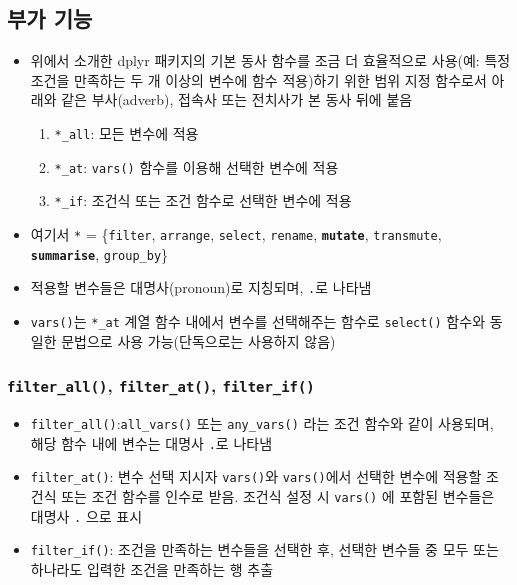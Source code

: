 \documentclass[
  11pt,
]{krantz}
\makeatletter
\providecommand{\tightlist}{%
  \setlength{\itemsep}{0pt}\setlength{\parskip}{0pt}}
\newenvironment{kframe}{%
\medskip{}
\setlength{\fboxsep}{.8em}
 \def\at@end@of@kframe{}%
 \ifinner\ifhmode%
  \def\at@end@of@kframe{\end{minipage}}%
  \begin{minipage}{\columnwidth}%
 \fi\fi%
 \def\FrameCommand##1{\hskip\@totalleftmargin \hskip-\fboxsep
 \colorbox{shadecolor}{##1}\hskip-\fboxsep
     \hskip-\linewidth \hskip-\@totalleftmargin \hskip\columnwidth}%
 \MakeFramed {\advance\hsize-\width
   \@totalleftmargin\z@ \linewidth\hsize
   \@setminipage}}%
 {\par\unskip\endMakeFramed%
 \at@end@of@kframe}
\renewenvironment{quote}{\begin{kframe}}{\end{kframe}}
\makeatother
\begin{document}
\normalsize

\hypertarget{dplyr-verb-variant-adverb}{%
\subsection{부가 기능}\label{dplyr-verb-variant-adverb}}

\begin{itemize}
\item
  위에서 소개한 dplyr 패키지의 기본 동사 함수를 조금 더 효율적으로 사용(예: 특정 조건을 만족하는 두 개 이상의 변수에 함수 적용)하기 위한 범위 지정 함수로서 아래와 같은 부사(adverb), 접속사 또는 전치사가 본 동사 뒤에 붙음

  \begin{enumerate}
  \def\labelenumi{\alph{enumi}.}
  \tightlist
  \item
    \texttt{*\_all}: 모든 변수에 적용
  \item
    \texttt{*\_at}: \texttt{vars()} 함수를 이용해 선택한 변수에 적용
  \item
    \texttt{*\_if}: 조건식 또는 조건 함수로 선택한 변수에 적용
  \end{enumerate}
\item
  여기서 \texttt{*} = \{\texttt{filter}, \texttt{arrange}, \texttt{select}, \texttt{rename}, \textbf{\texttt{mutate}}, \texttt{transmute}, \textbf{\texttt{summarise}}, \texttt{group\_by}\}
\item
  적용할 변수들은 대명사(pronoun)로 지칭되며, \texttt{.}로 나타냄
\item
  \texttt{vars()}는 \texttt{*\_at} 계열 함수 내에서 변수를 선택해주는 함수로 \texttt{select()} 함수와 동일한 문법으로 사용 가능(단독으로는 사용하지 않음)
\end{itemize}

\hypertarget{filter-variant}{%
\subsubsection*{\texorpdfstring{\texttt{filter\_all()}, \texttt{filter\_at()}, \texttt{filter\_if()}}{filter\_all(), filter\_at(), filter\_if()}}\label{filter-variant}}


\begin{quote}
\begin{itemize}
\tightlist
\item
  \texttt{filter\_all()}:\texttt{all\_vars()} 또는 \texttt{any\_vars()} 라는 조건 함수와 같이 사용되며, 해당 함수 내에 변수는 대명사 \texttt{.}로 나타냄
\item
  \texttt{filter\_at()}: 변수 선택 지시자 \texttt{vars()}와 \texttt{vars()}에서 선택한 변수에 적용할 조건식 또는 조건 함수를 인수로 받음. 조건식 설정 시 \texttt{vars()} 에 포함된 변수들은 대명사 \texttt{.} 으로 표시
\item
  \texttt{filter\_if()}: 조건을 만족하는 변수들을 선택한 후, 선택한 변수들 중 모두 또는 하나라도 입력한 조건을 만족하는 행 추출
\end{itemize}
\end{quote}
\end{document}

